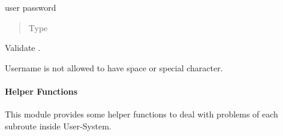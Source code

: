 \documentclass[a4paper,12pt,english]{sphinxmanual}
\begin{document}
\begin{fulllineitems}
\begin{fulllineitems}
\label{\detokenize{project_rst/user_rst/forms:project.user.forms.RegisterForm.password}}
user password
\begin{quote}\begin{description}
\item[{Type}] \leavevmode
{}

\end{description}\end{quote}

\end{fulllineitems}


\begin{fulllineitems}
\label{\detokenize{project_rst/user_rst/forms:project.user.forms.RegisterForm.validate_username}}
Validate {\hyperref[\detokenize{project_rst/user_rst/forms:project.user.forms.RegisterForm.username}]{}}.

Username is not allowed to have space or special character.

\end{fulllineitems}


\end{fulllineitems}

\label{\detokenize{project_rst/user_rst/helpers:module-project.user.helpers}}

\paragraph{Helper Functions}
\label{\detokenize{project_rst/user_rst/helpers:helper-functions}}\label{\detokenize{project_rst/user_rst/helpers::doc}}
 

This module provides some helper functions to deal with problems
of each subroute inside User-System.
\end{document}
